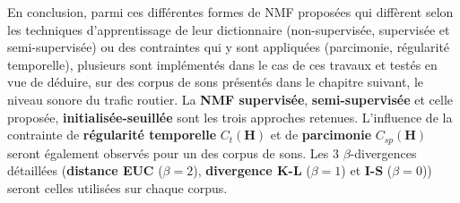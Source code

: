 En conclusion, parmi ces différentes formes de NMF proposées qui diffèrent selon les techniques d'apprentissage de leur dictionnaire (non-supervisée, supervisée et semi-supervisée) ou des contraintes qui y sont appliquées (parcimonie, régularité temporelle), plusieurs sont implémentés dans le cas de ces travaux et testés en vue de déduire, sur des corpus de sons présentés dans le chapitre suivant, le niveau sonore du trafic routier.
La \textbf{NMF supervisée}, \textbf{semi-supervisée} et celle proposée, \textbf{initialisée-seuillée} sont les trois approches retenues. L'influence de la contrainte de \textbf{régularité temporelle} $C_t(\mathbf{H})$ et de \textbf{parcimonie} $C_{sp}(\mathbf{H})$ seront également observés pour un des corpus de sons. Les 3 $\beta$-divergences détaillées (\textbf{distance EUC} ($\beta = 2$), \textbf{divergence K-L} ($\beta = 1$) et \textbf{I-S} ($\beta = 0$)) seront celles utilisées sur chaque corpus.


